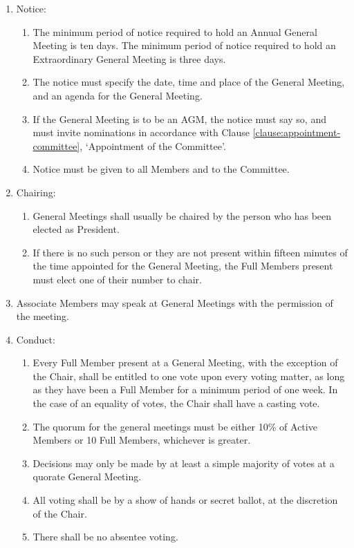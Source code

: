 \documentclass[12pt]{constitution}
\begin{document}
\begin{enumerate}
    \item Notice:
    \begin{enumerate}
        \item The minimum period of notice required to hold an Annual General Meeting is ten days.  The minimum period of notice required to hold an Extraordinary General Meeting is three days.
        \item The notice must specify the date, time and place of the General Meeting, and an agenda for the General Meeting.
        \item If the General Meeting is to be an AGM, the notice must say so, and must invite nominations in accordance with Clause \ref{clause:appointment-committee}, `Appointment of the Committee'.
        \item Notice must be given to all Members and to the Committee.
    \end{enumerate}

    \item Chairing:
    \begin{enumerate}
        \item General Meetings shall usually be chaired by the person who has been elected as President.
        \item If there is no such person or they are not present within fifteen minutes of the time appointed for the General Meeting, the Full Members present must elect one of their number to chair.
    \end{enumerate}

    \item Associate Members may speak at General Meetings with the permission of the meeting.

    \item Conduct:
    \begin{enumerate}
        \item Every Full Member present at a General Meeting, with the exception of the Chair, shall be entitled to one vote upon every voting matter, as long as they have been a Full Member for a minimum period of one week.  In the case of an equality of votes, the Chair shall have a casting vote.
        \item The quorum for the general meetings must be either 10\% of Active Members or 10 Full Members, whichever is greater.
        \item Decisions may only be made by at least a simple majority of votes at a quorate General Meeting.
        \item All voting shall be by a show of hands or secret ballot, at the discretion of the Chair.
        \item There shall be no absentee voting.
    \end{enumerate}


\end{enumerate}
\end{document}
